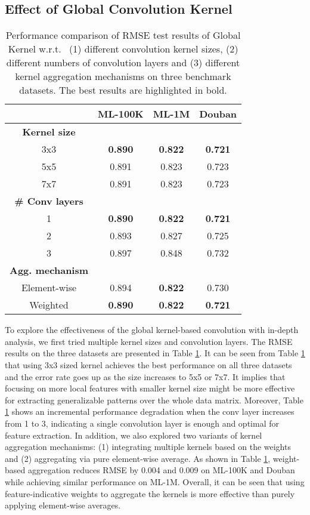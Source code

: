 \documentclass[sigconf]{acmart}
\begin{document}
\subsection{Effect of Global Convolution Kernel}
\begin{table}[t]
\caption{Performance comparison of RMSE test results of Global Kernel w.r.t.~ (1) different convolution kernel sizes, (2) different numbers of convolution layers and (3) different kernel aggregation mechanisms on three benchmark datasets. The best results are highlighted in bold.}
\vspace{-0.25cm}
\label{tab:different_parameter}
{\small
\begin{tabular}{cccc}
\hline
 & \textbf{ML-100K} & \textbf{ML-1M} & \textbf{Douban} \\ \hline
\textbf{Kernel size} &  &  &  \\
3x3 & \textbf{0.890} & \textbf{0.822} & \textbf{0.721} \\
5x5 & 0.891 & 0.823 & 0.723 \\
7x7 & 0.891 & 0.823 & 0.723 \\ \hline \hline
\textbf{\# Conv layers} &  &  &  \\
1 & \textbf{0.890} & \textbf{0.822} & \textbf{0.721} \\
2 & 0.893 & 0.827 & 0.725 \\
3 & 0.897 & 0.848 & 0.732 \\ \hline \hline
\textbf{Agg. mechanism} &  &  &  \\
Element-wise & 0.894 & \textbf{0.822} & 0.730 \\
Weighted & \textbf{0.890} & \textbf{0.822} & \textbf{0.721} \\ \hline
\end{tabular}
}
\vspace{-2mm}
\end{table}
To explore the effectiveness of the global kernel-based convolution with in-depth analysis, we first tried multiple kernel sizes and convolution layers. The RMSE results on the three datasets are presented in Table \ref{tab:different_parameter}. It can be seen from Table \ref{tab:different_parameter} that using 3x3 sized kernel achieves the best performance on all three datasets and the error rate goes up as the size increases to 5x5 or 7x7. It implies that focusing on more local features with smaller kernel size might be more effective for extracting generalizable patterns over the whole data matrix. Moreover, Table \ref{tab:different_parameter} shows an incremental performance degradation when the conv layer increases from 1 to 3, indicating a single convolution layer is enough and optimal for feature extraction. In addition, we also explored two variants of kernel aggregation mechanisms: (1) integrating multiple kernels based on the weights and (2) aggregating via pure element-wise average. As shown in Table \ref{tab:different_parameter}, weight-based aggregation reduces RMSE by 0.004 and 0.009 on ML-100K and Douban while achieving similar performance on ML-1M. Overall, it can be seen that using feature-indicative weights to aggregate the kernels is more effective than purely applying element-wise averages.
\end{document}
